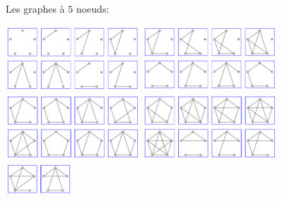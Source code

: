 \documentclass{beamer}
\begin{document}
\begin{frame}{Les graphes à $5$ noeuds:}

  \includegraphics[width=5cm]{media/graphs-5-1.png}
  \includegraphics[width=5cm]{media/graphs-5-2.png}\\
  \includegraphics[width=5cm]{media/graphs-5-3.png}
  \includegraphics[width=5cm]{media/graphs-5-4.png}\\
  \includegraphics[width=2.5cm]{media/graphs-5-5.png}
\end{frame}
\end{document}
